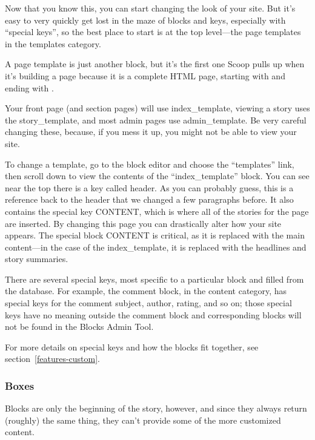 Now that you know this, you can start changing the look of your site.  But it's easy to very quickly get lost in the maze of blocks and keys, especially with ``special keys'', so the best place to start is at the top level---the page templates in the templates category.

A page template is just another block, but it's the first one Scoop pulls up when it's building a page because it is a complete HTML page, starting with  and ending with .

Your front page (and section pages) will use index\_template, viewing a story uses the story\_template, and most admin pages use admin\_template.  Be very careful changing these, because, if you mess it up, you might not be able to view your site.

To change a template, go to the block editor and choose the ``templates'' link, then scroll down to view the contents of the ``index\_template'' block.  You can see near the top there is a key called \latexhtml{$\vert$}{|}header\latexhtml{$\vert$}{|}.  As you can probably guess, this is a reference back to the header that we changed a few paragraphs before.  It also contains the special key \latexhtml{$\vert$}{|}CONTENT\latexhtml{$\vert$}{|}, which is where all of the stories for the page are inserted.  By changing this page you can drastically alter how your site appears.  The special block \latexhtml{$\vert$}{|}CONTENT\latexhtml{$\vert$}{|} is critical, as it is replaced with the main content---in the case of the index\_template, it is replaced with the headlines and story summaries.

There are several special keys, most specific to a particular block and filled from the database.  For example, the comment block, in the content category, has special keys for the comment subject, author, rating, and so on; those special keys have no meaning outside the comment block and corresponding blocks will not be found in the Blocks Admin Tool.

For more details on special keys and how the blocks fit together, see section~\ref{features-custom}.

\subsubsection{Boxes}
\label{how-boxes}

Blocks are only the beginning of the story, however, and since they always return (roughly) the same thing, they can't provide some of the more customized content.  

